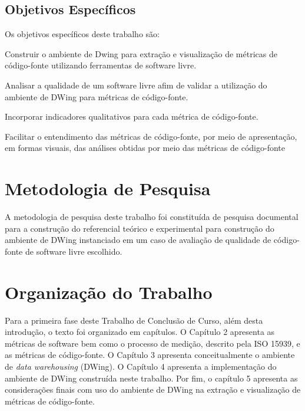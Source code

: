 
\subsection{Objetivos Específicos}

Os objetivos específicos deste trabalho são:


\begin{objectives}
	\item Construir o ambiente de Dwing para extração e visualização de 
	métricas de código-fonte utilizando ferramentas de software livre. 

	\item Analisar a qualidade de um software livre afim de validar a utilização do ambiente de DWing para métricas de código-fonte.
  
	\item Incorporar indicadores qualitativos para cada métrica de código-fonte.
	
	\item Facilitar o entendimento das métricas de código-fonte, por meio de 
	apresentação, em formas visuais, das análises obtidas por meio das métricas de código-fonte
	
    \end{objectives}
	



\section {Metodologia de Pesquisa}

A metodologia de pesquisa deste trabalho foi constituída de pesquisa documental para a construção do referencial teórico e experimental para construção do ambiente de DWing instanciado em um caso de avaliação de qualidade de código-fonte de software livre escolhido. 

\section{Organização do Trabalho}

Para a primeira fase deste Trabalho de Conclusão de Curso, além desta 
introdução, o texto foi organizado em capítulos. O Capítulo 2 apresenta as 
métricas de software bem como o processo de medição, descrito pela ISO 15939, 
e as métricas de código-fonte. O Capítulo 3 
apresenta conceitualmente o ambiente de \textit{data warehousing} (DWing). O 
Capítulo 4 apresenta a implementação do ambiente de DWing construída neste 
trabalho. Por fim, o capítulo 5 apresenta as considerações finais com uso do 
ambiente de DWing na extração e visualização de métricas de código-fonte. 
